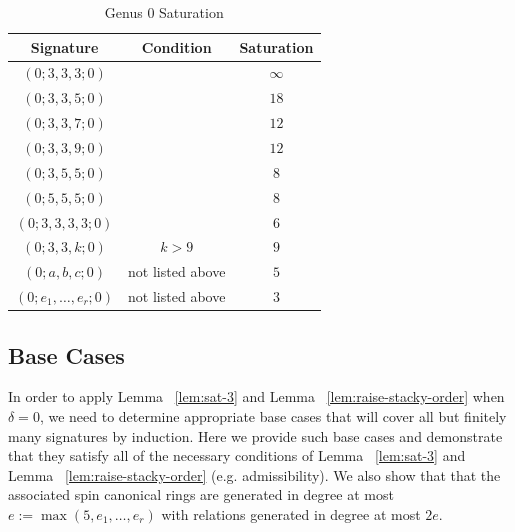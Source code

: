 \documentclass{amsart}
\theoremstyle{plain}
\theoremstyle{definition}
\theoremstyle{remark}
\numberwithin{equation}{section}
\newcommand\ssec{\subsection}
\begin{document}
\begin{longtable}
	{| c | c || c |}
	\caption{Genus 0 Saturation}
	\label{table:g-0-sat}
	
	\tabularnewline
	
	\hline
	Signature & Condition & Saturation \\
	\hline
	\hline

	$(0; 3, 3, 3; 0)$ & & $\infty$ \\	\hline

	$(0; 3, 3, 5; 0)$ & & $18$ \\	\hline
	
	$(0; 3, 3, 7; 0)$ & & $12$ \\	\hline
	
	$(0; 3, 3, 9; 0)$ & & $12$ \\	\hline
	
	$(0; 3, 5, 5; 0)$ & & $8$ \\	\hline
	
	$(0; 5, 5, 5; 0)$ & & $8$ \\	\hline
	
	$(0; 3, 3, 3, 3; 0)$ & & $6$ \\	\hline
	
	\hline
	\hline
	
	$(0; 3, 3, k; 0)$ & $k > 9$ & $9$ \\	\hline
	
	$(0; a, b, c; 0)$ & not listed above & $5$ \\	\hline
	
	$(0; e_1, \ldots, e_r; 0)$ & not listed above & $3$ \\	\hline
\end{longtable}

\ssec{Base Cases}
\label{ssec:g_0_base}
In order to apply Lemma ~\ref{lem:sat-3} and Lemma
~\ref{lem:raise-stacky-order} when $\delta = 0$,
we need to determine appropriate base cases that will
cover all but finitely many signatures by induction.
Here we provide such base cases and demonstrate that
they satisfy all of the necessary conditions of
Lemma ~\ref{lem:sat-3} and Lemma ~\ref{lem:raise-stacky-order}
(e.g. admissibility). We also show that that the associated spin
canonical rings are generated in degree at most $e := \max(5, e_1,
\ldots, e_r)$ with relations generated in degree at most $2e$.
\end{document}
